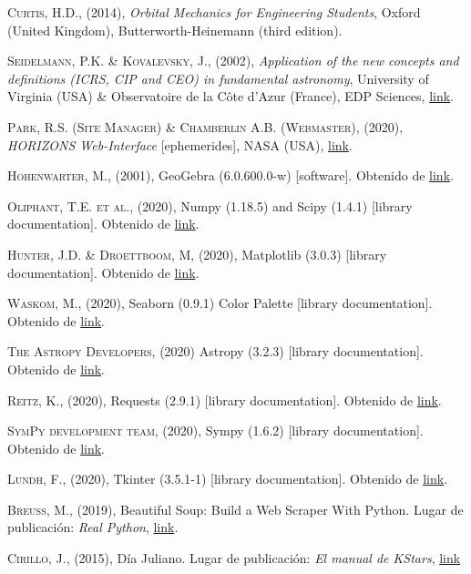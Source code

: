 \documentclass[11pt]{book}
\begin{document}
\begin{thebibliography}{99}
 \textsc{Curtis, H.D.}, (2014), \textit{Orbital Mechanics for Engineering Students}, Oxford (United Kingdom), Butterworth-Heinemann (third edition).

 \textsc{Seidelmann, P.K. \& Kovalevsky, J.}, (2002), \textit{Application of the new concepts and definitions (ICRS, CIP and CEO) in fundamental astronomy}, University of Virginia (USA) \& Observatoire de la Côte d'Azur (France), EDP Sciences, \href{https://www.aanda.org/articles/aa/full/2002/34/aa2452/aa2452.html}{link}.

 \textsc{Park, R.S. (Site Manager) \& Chamberlin A.B. (Webmaster)}, (2020), \textit{HORIZONS Web-Interface} [ephemerides], NASA (USA), \href{https://ssd.jpl.nasa.gov/horizons.cgi}{link}.

 \textsc{Hohenwarter, M.}, (2001), GeoGebra (6.0.600.0-w) [software]. Obtenido de \href{https://www.geogebra.org/classic}{link}.

 \textsc{Oliphant, T.E. et al.}, (2020), Numpy (1.18.5) and Scipy (1.4.1) [library documentation]. Obtenido de \href{https://docs.scipy.org/doc/}{link}.

 \textsc{Hunter, J.D. \& Droettboom, M}, (2020), Matplotlib (3.0.3) [library documentation]. Obtenido de \href{https://matplotlib.org/3.0.3/index.html}{link}.

 \textsc{Waskom, M.}, (2020), Seaborn (0.9.1) Color Palette [library documentation]. Obtenido de \href{https://seaborn.pydata.org/tutorial/color_palettes.html}{link}.

 \textsc{The Astropy Developers}, (2020) Astropy (3.2.3) [library documentation]. Obtenido de \href{https://docs.astropy.org/en/stable/index.html}{link}.

 \textsc{Reitz, K.}, (2020), Requests (2.9.1) [library documentation]. Obtenido de \href{https://requests.readthedocs.io/_/downloads/es/es/latest/pdf/}{link}.

 \textsc{SymPy development team}, (2020), Sympy (1.6.2) [library documentation]. Obtenido de \href{https://docs.sympy.org/latest/index.html}{link}.

 \textsc{Lundh, F.}, (2020), Tkinter (3.5.1-1) [library documentation]. Obtenido de \href{https://docs.python.org/3/library/tk.html}{link}.


 \textsc{Breuss, M.}, (2019), Beautiful Soup: Build a Web Scraper With Python. Lugar de publicación: \textit{Real Python}, \href{https://realpython.com/beautiful-soup-web-scraper-python/}{link}.

 \textsc{Cirillo, J.}, (2015), Día Juliano. Lugar de publicación: \textit{El manual de KStars}, \href{https://docs.kde.org/trunk5/es/extragear-edu/kstars/ai-julianday.html#:~:text=El%20n%C3%BAmero%20de%20d%C3%ADas%20se,n%C3%BAmeros%20de%20sus%20d%C3%ADas%20julianos.}{link}


\end{thebibliography}
\end{document}
